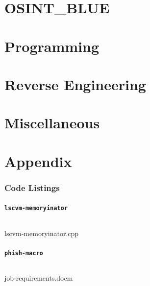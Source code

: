 \documentclass[12pt]{article}
\begin{document}
\pagebreak\part{OSINT\_BLUE}


\pagebreak\part{Programming}


\pagebreak\part{Reverse Engineering}


\pagebreak\part{Miscellaneous}




\makeatletter{}\makeatother
\pagebreak\part{Appendix}
\section{Code Listings}

	\subsection{\texttt{lscvm-memoryinator}}
		\vspace{\baselineskip}
		\begin{multipagecode}
			\inputminted[xleftmargin=0.075\textwidth,xrightmargin=0.075\textwidth,frame=leftline,framesep=4mm,framerule=0.4mm,
	linenos=true]{cpp}{../lscvm/lscvm-memoryinator.cpp}
			\caption{lscvm-memoryinator.cpp}
			\label{code:lscvm-memoryinator}
		\end{multipagecode}

	\subsection{\texttt{phish-macro}}
		\vspace{\baselineskip}
		\begin{multipagecode}
			\inputminted[xleftmargin=0.075\textwidth,xrightmargin=0.075\textwidth,frame=leftline,framesep=4mm,framerule=0.4mm,
	linenos=true]{vbnet}{figures/osintblue/macro.vba}
			\caption{job-requirements.docm}
			\label{code:vbaphish}
		\end{multipagecode}
\end{document}
